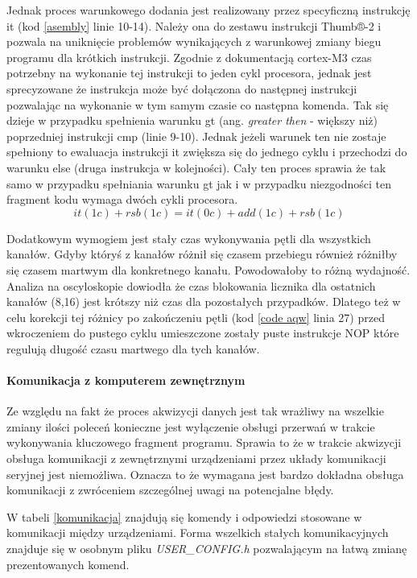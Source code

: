 Jednak proces warunkowego dodania jest realizowany przez specyficzną instrukcję it (kod \ref{asembly} linie 10-14).
Należy ona do zestawu instrukcji Thumb®-2 i pozwala na uniknięcie problemów wynikających z warunkowej zmiany biegu programu dla krótkich instrukcji. 
Zgodnie z dokumentacją\cite{cycles} cortex-M3 czas potrzebny na wykonanie tej instrukcji to jeden cykl procesora, jednak jest sprecyzowane że instrukcja może być dołączona do następnej instrukcji pozwalając na wykonanie w tym samym czasie co następna komenda.
Tak się dzieje w przypadku spełnienia warunku gt (ang. \textit{greater then} - większy niż) poprzedniej instrukcji cmp (linie 9-10). Jednak jeżeli warunek ten nie zostaje spełniony to ewaluacja instrukcji it zwiększa się do jednego cyklu i przechodzi do warunku else (druga instrukcja w kolejności).
Cały ten proces sprawia że tak samo w przypadku spełniania warunku gt jak i w przypadku niezgodności ten fragment kodu wymaga dwóch cykli procesora.
$$it(1c) + rsb(1c) = it(0c) + add(1c) + rsb(1c)$$

Dodatkowym wymogiem jest stały czas wykonywania pętli dla wszystkich kanałów. Gdyby któryś z kanałów różnił się czasem przebiegu również różniłby się czasem martwym dla konkretnego kanału. Powodowałoby to różną wydajność. 
Analiza na oscyloskopie dowiodła że czas blokowania licznika dla ostatnich kanałów (8,16) jest krótszy niż czas dla pozostałych przypadków. Dlatego też w celu korekcji tej różnicy po zakończeniu pętli (kod \ref{code aqw} linia 27) przed wkroczeniem do pustego cyklu umieszczone zostały puste instrukcje NOP które regulują długość czasu martwego dla tych kanałów. 


\paragraph{Komunikacja z komputerem zewnętrznym}
Ze względu na fakt że proces akwizycji danych jest tak wrażliwy na wszelkie zmiany ilości poleceń konieczne jest wyłączenie obsługi przerwań w trakcie wykonywania kluczowego fragment programu. 
Sprawia to że w trakcie akwizycji obsługa komunikacji z zewnętrznymi urządzeniami przez układy komunikacji seryjnej jest niemożliwa. 
Oznacza to że wymagana jest bardzo dokładna obsługa komunikacji z zwróceniem szczególnej uwagi na potencjalne błędy. 

W tabeli \ref{komunikacja} znajdują się komendy i odpowiedzi stosowane w komunikacji między urządzeniami. 
Forma wszelkich stałych komunikacyjnych znajduje się w osobnym pliku \textit{USER\_CONFIG.h} pozwalającym na łatwą zmianę prezentowanych komend.

